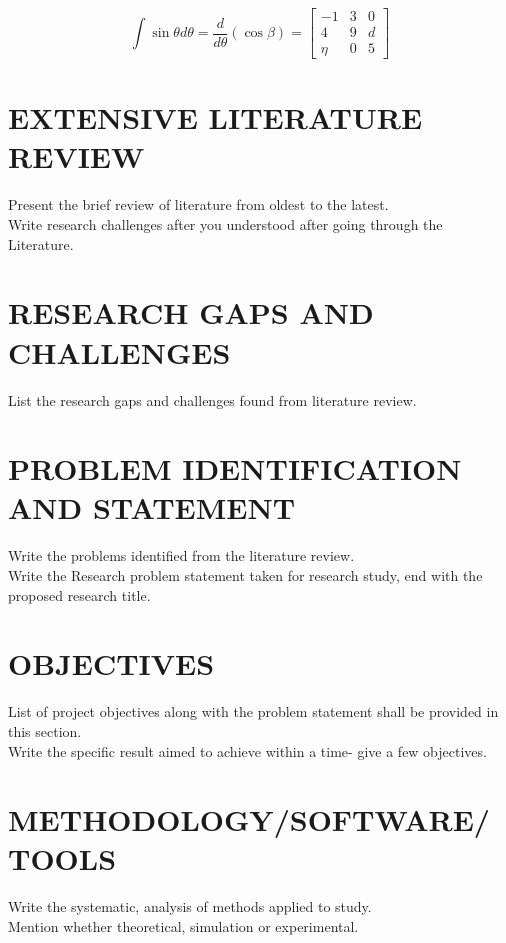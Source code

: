 \begin{equation} 
\label{eq:abc}
\int {\sin \theta d\theta  = \frac{d}{{d\theta }}\left( {\cos \beta } \right)}  = \left[ {\begin{array}{*{20}{c}}
	{ - 1}&3&0 \\ 
	4&9&d \\ 
	\eta &0&5 
	\end{array}} \right]	
\end{equation}


\section{EXTENSIVE LITERATURE REVIEW }
Present the brief review of literature from oldest to the latest.\\
Write research challenges after you understood after going through the Literature.\\

\section{RESEARCH GAPS AND CHALLENGES}
List the research gaps and challenges found from literature review.


\section{PROBLEM IDENTIFICATION AND STATEMENT}
Write the problems identified from the literature review.\\
Write the Research problem statement taken for research study, end with the proposed research title.


\section{OBJECTIVES}
List of project objectives along with the problem statement shall be provided in this section.\\
Write the specific result aimed to achieve within a time- give a few objectives.\\

\section{METHODOLOGY/SOFTWARE/TOOLS}
Write the systematic, analysis of methods applied to study.\\
Mention whether theoretical, simulation or experimental.


